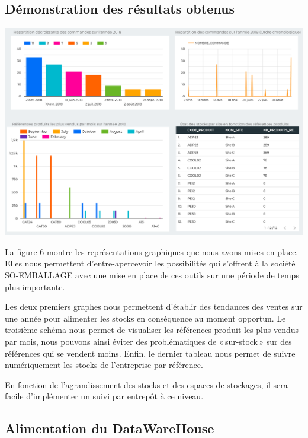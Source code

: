 \subsection{Démonstration des résultats obtenus}

\begin{center}
	\includegraphics[scale=0.88]{images/dashboard.png} 
\end{center}  

La figure 6 montre les représentations graphiques que nous avons mises en place. Elles nous permettent d’entre-apercevoir les possibilités qui s’offrent à la société SO-EMBALLAGE avec une mise en place de ces outils sur une période de temps plus importante. 

Les deux premiers graphes nous permettent d’établir des tendances des ventes sur une année pour alimenter les stocks en conséquence au moment opportun. Le troisième schéma nous permet de visualiser les références produit les plus vendus par mois, nous pouvons ainsi éviter des problématiques de « sur-stock » sur des références qui se vendent moins. Enfin, le dernier tableau nous permet de suivre numériquement les stocks de l’entreprise par référence.  

En fonction de l’agrandissement des stocks et des espaces de stockages, il sera facile d’implémenter un suivi par entrepôt à ce niveau.   

\subsection{Alimentation du DataWareHouse}

